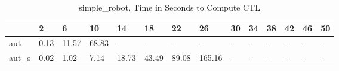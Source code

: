 \begin{table}
\caption{simple_robot, Time in Seconds to Compute CTL}
\label{simple_robot_CTL_time}
\begin{tabular}{llllllllllllll}
\toprule
 & 2 & 6 & 10 & 14 & 18 & 22 & 26 & 30 & 34 & 38 & 42 & 46 & 50 \\
\midrule
aut & 0.13 & 11.57 & 68.83 & - & - & - & - & - & - & - & - & - & - \\
aut_s & 0.02 & 1.02 & 7.14 & 18.73 & 43.49 & 89.08 & 165.16 & - & - & - & - & - & - \\
\bottomrule
\end{tabular}
\end{table}
